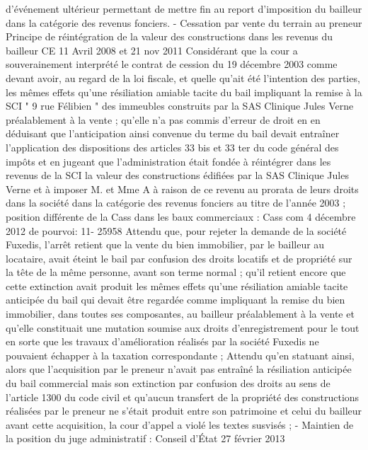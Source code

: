 \documentclass[11pt,a4paper]{report}
\begin{document}
	d'événement ultérieur permettant de mettre fin au report d'imposition du bailleur dans la catégorie des revenus
	fonciers.
	- Cessation par vente du terrain au preneur
	Principe de réintégration de la valeur des constructions dans les revenus du bailleur
	CE 11 Avril 2008  et 21 nov 2011 
	Considérant que la cour a souverainement interprété le contrat de cession du 19 décembre 2003 comme devant
	avoir, au regard de la loi fiscale, et quelle qu'ait été l'intention des parties, les mêmes effets qu'une résiliation
	amiable tacite du bail impliquant la remise à la SCI " 9 rue Félibien " des immeubles construits par la SAS
	Clinique Jules Verne préalablement à la vente ; qu'elle n'a pas commis d'erreur de droit en en déduisant que
	l'anticipation ainsi convenue du terme du bail devait entraîner l'application des dispositions des articles 33 bis
	et 33 ter du code général des impôts et en jugeant que l'administration était fondée à réintégrer dans les revenus
	de la SCI la valeur des constructions édifiées par la SAS Clinique Jules Verne et à imposer M. et Mme A à
	raison de ce revenu au prorata de leurs droits dans la société dans la catégorie des revenus fonciers au titre de
	l'année 2003 ;
	position différente de la Cass dans les baux commerciaux : Cass com 4 décembre 2012 \No  de pourvoi: 11-
	25958
	Attendu que, pour rejeter la demande de la société Fuxedis, l'arrêt retient que la vente du bien immobilier, par le
	bailleur au locataire, avait éteint le bail par confusion des droits locatifs et de propriété sur la tête de la même
	personne, avant son terme normal ; qu'il retient encore que cette extinction avait produit les mêmes effets qu'une
	résiliation amiable tacite anticipée du bail qui devait être regardée comme impliquant la remise du bien
	immobilier, dans toutes ses composantes, au bailleur préalablement à la vente et qu'elle constituait une mutation
	soumise aux droits d'enregistrement pour le tout en sorte que les travaux d'amélioration réalisés par la société
	Fuxedis ne pouvaient échapper à la taxation correspondante ;
	Attendu qu'en statuant ainsi, alors que l'acquisition par le preneur n'avait pas entraîné la résiliation anticipée
	du bail commercial mais son extinction par confusion des droits au sens de l'article 1300 du code civil et
	qu'aucun transfert de la propriété des constructions réalisées par le preneur ne s'était produit entre son
	patrimoine et celui du bailleur avant cette acquisition, la cour d'appel a violé les textes susvisés ;
	- Maintien de la position du juge administratif : Conseil d'État 27 février 2013
\end{document}
